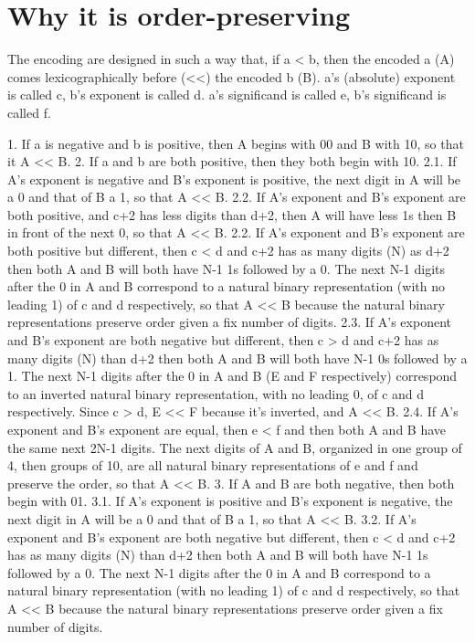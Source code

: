 \documentclass{acm_proc_article-sp}
\begin{document}
\section{Why it is order-preserving}

The encoding are designed in such a way that, if a < b, then the encoded a (A) comes lexicographically before (<<) the encoded b (B). a's (absolute) exponent is called c, b's exponent is called d. a's significand is called e, b's significand is called f.

1. If a is negative and b is positive, then A begins with 00 and B with 10, so that it A << B.
2. If a and b are both positive, then they both begin with 10.
  2.1. If A's exponent is negative and B's exponent is positive, the next digit in A will be a 0 and that of B a 1, so that A << B.
  2.2. If A's exponent and B's exponent are both positive, and c+2 has less digits than d+2, then A will have less 1s then B in front of the next 0, so that A << B.
  2.2. If A's exponent and B's exponent are both positive but different, then c < d and c+2 has as many digits (N) as d+2 then both A and B will both have N-1 1s followed by a 0. The next N-1 digits after the 0 in A and B correspond to a natural binary representation (with no leading 1) of c and d respectively, so that A << B because the natural binary representations preserve order given a fix number of digits.
  2.3. If A's exponent and B's exponent are both negative but different, then c > d and c+2 has as many digits (N) than d+2 then both A and B will both have N-1 0s followed by a 1. The next N-1 digits after the 0 in A and B (E and F respectively) correspond to an inverted natural binary representation, with no leading 0, of c and d respectively. Since c > d, E << F because it's inverted, and A << B.
  2.4. If A's exponent and B's exponent are equal, then e < f and then both A and B have the same next 2N-1 digits. The next digits of A and B, organized in one group of 4, then groups of 10, are all natural binary representations of e and f and preserve the order, so that A << B.
3. If A and B are both negative, then both begin with 01.
  3.1. If A's exponent is positive and B's exponent is negative, the next digit in A will be a 0 and that of B a 1, so that A << B.
  3.2. If A's exponent and B's exponent are both negative but different, then c < d and c+2 has as many digits (N) than d+2 then both A and B will both have N-1 1s followed by a 0. The next N-1 digits after the 0 in A and B correspond to a natural binary representation (with no leading 1) of c and d respectively, so that A << B because the natural binary representations preserve order given a fix number of digits.
\end{document}
